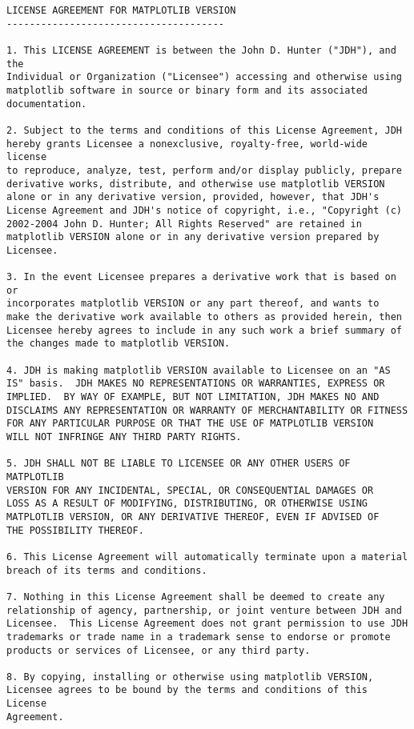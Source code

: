 \documentclass[twoside]{book}
\begin{document}
\begin{verbatim}
LICENSE AGREEMENT FOR MATPLOTLIB VERSION
--------------------------------------

1. This LICENSE AGREEMENT is between the John D. Hunter ("JDH"), and the
Individual or Organization ("Licensee") accessing and otherwise using
matplotlib software in source or binary form and its associated
documentation.

2. Subject to the terms and conditions of this License Agreement, JDH
hereby grants Licensee a nonexclusive, royalty-free, world-wide license
to reproduce, analyze, test, perform and/or display publicly, prepare
derivative works, distribute, and otherwise use matplotlib VERSION
alone or in any derivative version, provided, however, that JDH's
License Agreement and JDH's notice of copyright, i.e., "Copyright (c)
2002-2004 John D. Hunter; All Rights Reserved" are retained in
matplotlib VERSION alone or in any derivative version prepared by
Licensee.

3. In the event Licensee prepares a derivative work that is based on or
incorporates matplotlib VERSION or any part thereof, and wants to
make the derivative work available to others as provided herein, then
Licensee hereby agrees to include in any such work a brief summary of
the changes made to matplotlib VERSION.

4. JDH is making matplotlib VERSION available to Licensee on an "AS
IS" basis.  JDH MAKES NO REPRESENTATIONS OR WARRANTIES, EXPRESS OR
IMPLIED.  BY WAY OF EXAMPLE, BUT NOT LIMITATION, JDH MAKES NO AND
DISCLAIMS ANY REPRESENTATION OR WARRANTY OF MERCHANTABILITY OR FITNESS
FOR ANY PARTICULAR PURPOSE OR THAT THE USE OF MATPLOTLIB VERSION
WILL NOT INFRINGE ANY THIRD PARTY RIGHTS.

5. JDH SHALL NOT BE LIABLE TO LICENSEE OR ANY OTHER USERS OF MATPLOTLIB
VERSION FOR ANY INCIDENTAL, SPECIAL, OR CONSEQUENTIAL DAMAGES OR
LOSS AS A RESULT OF MODIFYING, DISTRIBUTING, OR OTHERWISE USING
MATPLOTLIB VERSION, OR ANY DERIVATIVE THEREOF, EVEN IF ADVISED OF
THE POSSIBILITY THEREOF.

6. This License Agreement will automatically terminate upon a material
breach of its terms and conditions.

7. Nothing in this License Agreement shall be deemed to create any
relationship of agency, partnership, or joint venture between JDH and
Licensee.  This License Agreement does not grant permission to use JDH
trademarks or trade name in a trademark sense to endorse or promote
products or services of Licensee, or any third party.

8. By copying, installing or otherwise using matplotlib VERSION,
Licensee agrees to be bound by the terms and conditions of this License
Agreement.

\end{verbatim}




\end{document}
